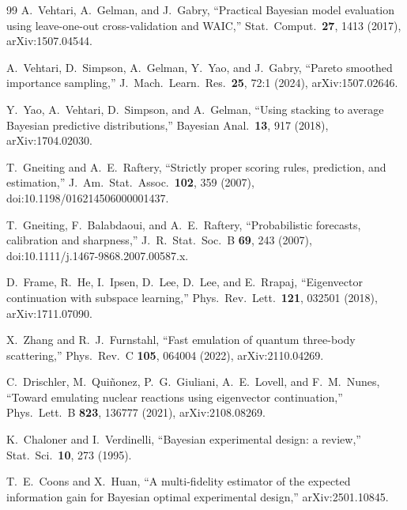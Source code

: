 \documentclass[11pt]{article}
\begin{document}
\begin{thebibliography}{99}
A.~Vehtari, A.~Gelman, and J.~Gabry,
``Practical Bayesian model evaluation using leave-one-out cross-validation
and WAIC,''
Stat.\ Comput.\ \textbf{27}, 1413 (2017), arXiv:1507.04544.

A.~Vehtari, D.~Simpson, A.~Gelman, Y.~Yao, and J.~Gabry,
``Pareto smoothed importance sampling,''
J.\ Mach.\ Learn.\ Res.\ \textbf{25}, 72:1 (2024), arXiv:1507.02646.

Y.~Yao, A.~Vehtari, D.~Simpson, and A.~Gelman,
``Using stacking to average Bayesian predictive distributions,''
Bayesian Anal.\ \textbf{13}, 917 (2018), arXiv:1704.02030.

T.~Gneiting and A.~E.~Raftery,
``Strictly proper scoring rules, prediction, and estimation,''
J.\ Am.\ Stat.\ Assoc.\ \textbf{102}, 359 (2007),
doi:10.1198/016214506000001437.

T.~Gneiting, F.~Balabdaoui, and A.~E.~Raftery,
``Probabilistic forecasts, calibration and sharpness,''
J.\ R.\ Stat.\ Soc.\ B \textbf{69}, 243 (2007),
doi:10.1111/j.1467-9868.2007.00587.x.

D.~Frame, R.~He, I.~Ipsen, D.~Lee, D.~Lee, and E.~Rrapaj,
``Eigenvector continuation with subspace learning,''
Phys.\ Rev.\ Lett.\ \textbf{121}, 032501 (2018), arXiv:1711.07090.

X.~Zhang and R.~J.~Furnstahl,
``Fast emulation of quantum three-body scattering,''
Phys.\ Rev.\ C \textbf{105}, 064004 (2022), arXiv:2110.04269.

C.~Drischler, M.~Qui\~nonez, P.~G.~Giuliani, A.~E.~Lovell, and F.~M.~Nunes,
``Toward emulating nuclear reactions using eigenvector continuation,''
Phys.\ Lett.\ B \textbf{823}, 136777 (2021), arXiv:2108.08269.

K.~Chaloner and I.~Verdinelli,
``Bayesian experimental design: a review,''
Stat.\ Sci.\ \textbf{10}, 273 (1995).

T.~E.~Coons and X.~Huan,
``A multi-fidelity estimator of the expected information gain for Bayesian
optimal experimental design,''
arXiv:2501.10845.

\end{thebibliography}
\end{document}
